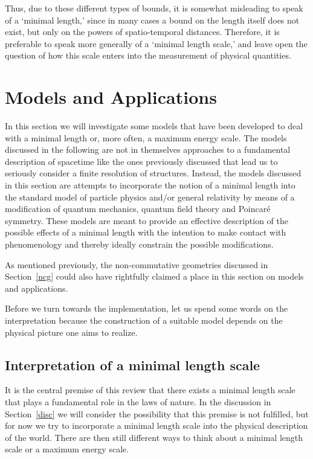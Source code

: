 \documentclass{article}
\begin{document}
Thus, due to these different types of bounds, it is somewhat misleading to speak of a `minimal length,'
since in many cases a bound on the length itself does not exist, but only on the powers of
spatio-temporal distances. Therefore, it is preferable to speak more generally of a `minimal length
scale,' and leave open the question of how this scale enters into the measurement of physical
quantities. 


\newpage

\section{Models and Applications}
\label{models}

In this section we will investigate some models that have been developed 
to deal with a minimal length or, more often,
a maximum energy scale. The models discussed in the following are not in themselves 
approaches to a fundamental description of spacetime like the ones previously discussed 
that lead us to seriously
consider a finite resolution of structures. Instead, the models discussed in
this section
are attempts to incorporate the notion of a minimal length into the standard model of
particle physics and/or general relativity
by means of a modification of quantum mechanics, quantum field theory and Poincar\'e symmetry. 
These models are meant to provide an effective description of the possible
effects of a minimal length with the intention to make contact with
phenomenology and thereby ideally constrain the possible modifications.%
 
As mentioned previously, the non-commutative geometries discussed in Section~\ref{ncg} 
could also have rightfully claimed a place in this section on models and applications.

Before we turn towards the implementation, let us spend
some words on the interpretation because the construction of a suitable model 
depends on the physical picture one aims to realize.

\subsection{Interpretation of a minimal length scale}

It is the central premise of this review that there exists a minimal length scale
that plays a fundamental role in the laws of nature. In the discussion in Section~\ref{disc} we 
will consider the possibility that this premise is not fulfilled, but for now we
try to incorporate a minimal length scale into the physical description of the
world. There are then still different ways to think about a minimal length scale
or a maximum energy scale. 
\end{document}
